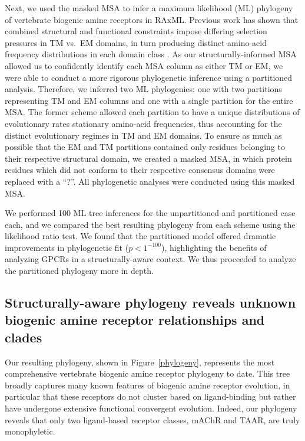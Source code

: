 \documentclass[fleqn,10pt]{wlpeerj}
\begin{document}
Next, we used the masked MSA to infer a maximum likelihood (ML) phylogeny of vertebrate biogenic amine receptors in RAxML. Previous work has shown that combined structural and functional constraints impose differing selection pressures in TM vs.\ EM domains, in turn producing distinct amino-acid frequency distributions in each domain class \citep{Tourasse2000,Stevens2001,Julenius2006,Oberai2009,SpielmanWilke2013,FranzosaXueXia2013}. As our structurally-informed MSA allowed us to confidently identify each MSA column as either TM or EM, we were able to conduct a more rigorous phylogenetic inference using a partitioned analysis. Therefore, we inferred two ML phylogenies: one with two partitions representing TM and EM columns and one with a single partition for the entire MSA. The former scheme allowed each partition to have a unique distributions of evolutionary rates stationary amino-acid frequencies, thus accounting for the distinct evolutionary regimes in TM and EM domains. To ensure as much as possible that the EM and TM partitions contained only residues belonging to their respective structural domain, we created a masked MSA, in which protein residues which did not conform to their respective consensus domains were replaced with a ``?''. All phylogenetic analyses were conducted using this masked MSA.

We performed 100 ML tree inferences for the unpartitioned and partitioned case each, and we compared the best resulting phylogeny from each scheme using the likelihood ratio test. We found that the partitioned model offered dramatic improvements in phylogenetic fit ($p < 1^{-100}$), highlighting the benefits of analyzing GPCRs in a structurally-aware context. We thus proceeded to analyze the partitioned phylogeny more in depth.


\subsection*{Structurally-aware phylogeny reveals unknown biogenic amine receptor relationships and clades}

Our resulting phylogeny, shown in Figure~\ref{phylogeny}, represents the most comprehensive vertebrate biogenic amine receptor phylogeny to date. This tree broadly captures many known features of biogenic amine receptor evolution, in particular that these receptors do not cluster based on ligand-binding but rather have undergone extensive functional convergent evolution. Indeed, our phylogeny reveals that only two ligand-based receptor classes, mAChR and TAAR, are truly monophyletic. 
\end{document}

